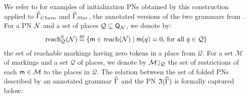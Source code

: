 \else We refer to  for examples of
initialization PNs obtained by this construction applied to
$\widehat{\Gamma}_{Chain}$ and $\widehat{\Gamma}_{Star}$, \ie the
annotated versions of the two grammars from
. \fi For a PN $\mathcal{N}$ and a
set of places $\mathcal{Q} \subseteq \mathsf{Q}_{\mathcal{N}}$, we denote
by:
\begin{align}\label{eq:zero-reach}
\mathrm{reach}^0_{\mathcal{Q}}({\mathcal{N}}) \stackrel{\scriptscriptstyle{\mathsf{def}}}{=}
\{\mathsf{m}\in\mathrm{reach}({\mathcal{N}}) \mid \mathsf{m}(q)=0
\text{, for all } q \in \mathcal{Q}\}
\end{align}
the set of reachable markings having zero tokens in a place from
$\mathcal{Q}$. For a set $\mathcal{M}$ of markings and a set
$\mathcal{Q}$ of places, we denote by
${\mathcal{M}}\!\downharpoonleft_{\mathcal{Q}}$ the set of restrictions of each
$\mathsf{m}\in\mathcal{M}$ to the places in $\mathcal{Q}$. The relation
between the set of folded PNs described by an annotated grammar
$\widehat{\Gamma}$ and the PN $\mathfrak{I}({\widehat{\Gamma}})$ is
formally captured below:

